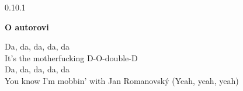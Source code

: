 
\clearpage
{}
{}
\begin{adjustwidth}{0.1\textwidth}{0.1\textwidth}
\begingroup
\null\vspace{0.2\textheight}
\begin{center}
{\bfseries\Large O autorovi}\par\vspace{2em}

Da, da, da, da, da \\
It's the motherfucking D-O-double-D \\
Da, da, da, da, da \\
You know I'm mobbin' with Jan Romanovský (Yeah, yeah, yeah)
\end{center}
\endgroup
\end{adjustwidth}
\clearpage
